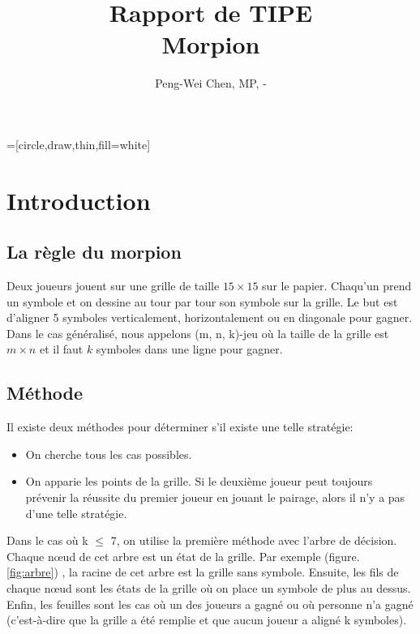 \documentclass[12pt, a4paper]{article}
\title{Rapport de TIPE\\
Morpion}
\author{Peng-Wei Chen, MP, \oldstylenums{2017}-\oldstylenums{2018}}
\begin{document}
\maketitle
{}=[circle,draw,thin,fill=white]

\section{Introduction}
\subsection{La règle du morpion}
Deux joueurs jouent sur une grille de taille $15 \times 15$ sur le papier. Chaqu'un prend un symbole et on dessine au tour par tour son symbole sur la grille. Le but est d'aligner 5 symboles verticalement, horizontalement ou en diagonale pour gagner.
Dans le cas généralisé, nous appelons (m, n, k)-jeu où la taille de la grille est $m \times n$ et il faut $k$ symboles dans une ligne pour gagner.
\subsection{Méthode}
Il existe deux méthodes pour déterminer s'il existe une telle stratégie:
\begin{itemize}
    \item On cherche tous les cas possibles.
    \item On apparie les points de la grille. Si le deuxième joueur peut toujours prévenir la réussite du premier joueur en jouant le pairage, alors il n'y a pas d'une telle stratégie.
\end{itemize}

Dans le cas où k $\le$ 7, on utilise la première méthode avec l'arbre de décision. Chaque nœud de cet arbre est un état de la grille. Par exemple (figure. \ref{fig:arbre}) , la racine de cet arbre est la grille sans symbole. Ensuite, les fils de chaque nœud sont les états de la grille où on place un symbole de plus au dessus. Enfin, les feuilles sont les cas où un des joueurs a gagné ou où personne n'a gagné (c'est-à-dire que la grille a été remplie et que aucun joueur a aligné k symboles).
\end{document}
